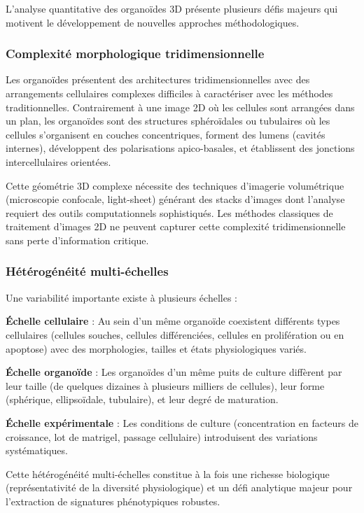 L'analyse quantitative des organoïdes 3D présente plusieurs défis majeurs qui motivent le développement de nouvelles approches méthodologiques.

\subsubsection{Complexité morphologique tridimensionnelle}

Les organoïdes présentent des architectures tridimensionnelles avec des arrangements cellulaires complexes difficiles à caractériser avec les méthodes traditionnelles. Contrairement à une image 2D où les cellules sont arrangées dans un plan, les organoïdes sont des structures sphéroïdales ou tubulaires où les cellules s'organisent en couches concentriques, forment des lumens (cavités internes), développent des polarisations apico-basales, et établissent des jonctions intercellulaires orientées.

Cette géométrie 3D complexe nécessite des techniques d'imagerie volumétrique (microscopie confocale, light-sheet) générant des stacks d'images dont l'analyse requiert des outils computationnels sophistiqués. Les méthodes classiques de traitement d'images 2D ne peuvent capturer cette complexité tridimensionnelle sans perte d'information critique.

\subsubsection{Hétérogénéité multi-échelles}

Une variabilité importante existe à plusieurs échelles :

\textbf{Échelle cellulaire} : Au sein d'un même organoïde coexistent différents types cellulaires (cellules souches, cellules différenciées, cellules en prolifération ou en apoptose) avec des morphologies, tailles et états physiologiques variés.

\textbf{Échelle organoïde} : Les organoïdes d'un même puits de culture diffèrent par leur taille (de quelques dizaines à plusieurs milliers de cellules), leur forme (sphérique, ellipsoïdale, tubulaire), et leur degré de maturation.

\textbf{Échelle expérimentale} : Les conditions de culture (concentration en facteurs de croissance, lot de matrigel, passage cellulaire) introduisent des variations systématiques.

Cette hétérogénéité multi-échelles constitue à la fois une richesse biologique (représentativité de la diversité physiologique) et un défi analytique majeur pour l'extraction de signatures phénotypiques robustes.

